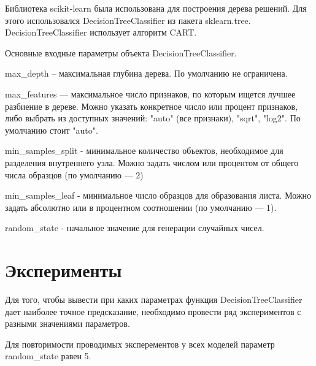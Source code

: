 \documentclass[a4paper,12pt]{article}
\begin{document}
	\vspace{0.5cm}
	Библиотека scikit-learn была использована для построения дерева решений. Для этого использовался DecisionTreeClassifier из пакета sklearn.tree. DecisionTreeClassifier использует алгоритм CART.
	
	\vspace{0.5cm}
	Основные входные параметры объекта DecisionTreeClassifier.
	
	\vspace{0.5cm}
	max\_depth – максимальная глубина дерева. По умолчанию не ограничена.
	
	\vspace{0.5cm}
	max\_features — максимальное число признаков, по которым ищется лучшее разбиение в дереве. Можно указать конкретное число или процент признаков, либо выбрать из доступных значений: "auto" (все признаки), "sqrt", "log2". По умолчанию стоит "auto".
	
	\vspace{0.5cm}
	min\_samples\_split - минимальное количество объектов, необходимое для разделения внутреннего узла. Можно задать числом или процентом от общего числа образцов (по умолчанию — 2)
	
	\vspace{0.5cm}
	min\_samples\_leaf - минимальное число образцов для образования листа. Можно задать абсолютно или в процентном соотношении (по умолчанию — 1).
	
	\vspace{0.5cm}
	random\_state - начальное значение для генерации случайных чисел.


	
\newpage\section{Эксперименты}
	Для того, чтобы вывести при каких параметрах функция DecisionTreeClassifier дает наиболее точное предсказание, необходимо провести ряд экспериментов с разными значениями параметров. 
	
	\vspace{0.5cm}
	Для повторимости проводимых эксперементов у всех моделей параметр random\_state равен 5. 
	
\end{document}
